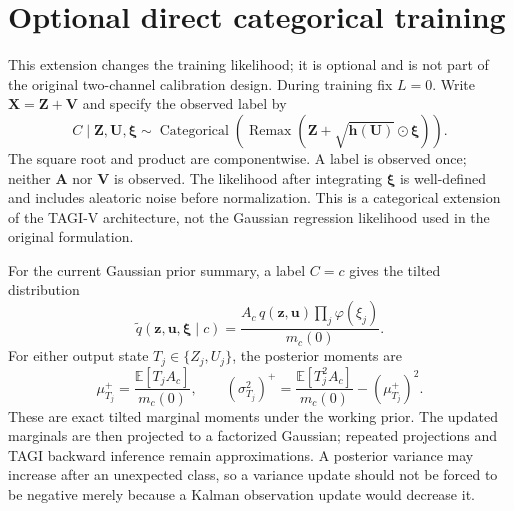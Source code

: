 \documentclass[letterpaper]{article}
\newcommand{\E}{\mathbb E}
\newcommand{\Remax}{\operatorname{Remax}}
\newcommand{\given}{\mid}
\begin{document}
\appendix
\section{Optional direct categorical training}\label{S:training}
This extension changes the training likelihood; it is optional and is not part of the original two-channel calibration design. During training fix $L=0$. Write $\bm X=\bm Z+\bm V$ and specify the observed label by
\begin{equation}
\boxed{C\given\bm Z,\bm U,\bm\xi\sim\operatorname{Categorical}(\Remax(\bm Z+\sqrt{\bm h(\bm U)}\odot\bm\xi)).}
\label{E:catmodel}
\end{equation}
The square root and product are componentwise. A label is observed once; neither $\bm A$ nor $\bm V$ is observed. The likelihood after integrating $\bm\xi$ is well-defined and includes aleatoric noise before normalization. This is a categorical extension of the TAGI-V architecture, not the Gaussian regression likelihood used in the original formulation.

For the current Gaussian prior summary, a label $C=c$ gives the tilted distribution
\begin{equation}
\widetilde q(\bm z,\bm u,\bm\xi\given c)
=\frac{A_c\,q(\bm z,\bm u)\prod_j\varphi(\xi_j)}{m_c(0)}.
\label{E:tilt}
\end{equation}
For either output state $T_j\in\{Z_j,U_j\}$, the posterior moments are
\begin{equation}
\boxed{
\mu_{T_j}^+=\frac{\E[T_jA_c]}{m_c(0)},\qquad
(\sigma_{T_j}^2)^+=\frac{\E[T_j^2A_c]}{m_c(0)}-(\mu_{T_j}^+)^2.
}\label{E:tiltedmoments}
\end{equation}
These are exact tilted marginal moments under the working prior. The updated marginals are then projected to a factorized Gaussian; repeated projections and TAGI backward inference remain approximations. A posterior variance may increase after an unexpected class, so a variance update should not be forced to be negative merely because a Kalman observation update would decrease it.
\end{document}
